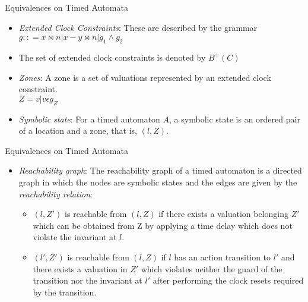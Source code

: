 \documentclass{beamer}
\begin{document}
\begin{frame}{Equivalences on Timed Automata}

  \begin{itemize}

    \item \emph{Extended Clock Constraints}: These are described by the  grammar\\
    $g :: = x \bowtie n | x - y \bowtie n | g_1 \wedge g_2$\\

    \item The set of extended clock constraints is denoted by $B^+(C)$

    \item \emph{Zones}: A zone is a set of valuations represented by an
      extended clock constraint.\\
      $Z = {v|v \epsilon g_Z}$

    \item \emph{Symbolic state}: For a timed automaton $A$, a symbolic
      state is an ordered pair of a location and a zone, that is, $(l,
      Z)$.

  \end{itemize}

\end{frame}

\begin{frame}{Equivalences on Timed Automata}

  \begin{itemize}

    \item \emph{Reachability graph}: The reachability graph of a timed
      automaton is a directed graph in which the nodes are symbolic states
      and the edges are given by the \emph{reachability relation}:
      \begin{itemize}
      \item $(l,Z')$ is reachable from $(l,Z)$ if there exists a
        valuation belonging $Z'$ which can be obtained
        from Z by applying a time delay which does not violate the
        invariant at $l$.

      \item $(l', Z')$ is reachable from $(l, Z)$ if $l$ has an action
        transition to $l'$ and there exists a valuation in $Z'$ which
        violates neither the guard of the
        transition nor the invariant at $l'$ after performing the
        clock resets required by the transition.

      \end{itemize}

  \end{itemize}

\end{frame}
\end{document}
